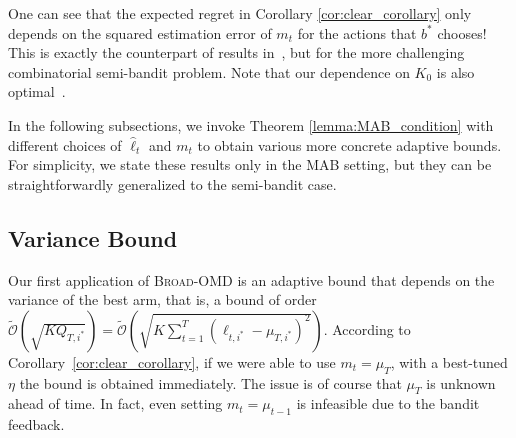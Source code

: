 \documentclass[final, 12pt]{colt2018} %
\newcommand{\inn}[1]{ \langle {#1} \rangle }
\begin{document}

One can see that the expected regret in Corollary \ref{cor:clear_corollary} only depends on the squared estimation error of $m_t$ for the actions that $b^*$ chooses! This is exactly the counterpart of results in~\citep{steinhardt2014adaptivity}, but for the more challenging combinatorial semi-bandit problem. 
Note that our dependence on $K_0$ is also optimal~\citep{audibert2013regret}.

In the following subsections, we invoke Theorem \ref{lemma:MAB_condition} with different choices of $\hat{\ell}_{t}$ and $m_t$ to obtain various more concrete adaptive bounds. %
For simplicity, we state these results only in the MAB setting, but they can be straightforwardly generalized to the semi-bandit case. 



\subsection{Variance Bound}
\label{subsubsection:variation bound}
Our first application of \textsc{Broad-OMD} is an adaptive bound that depends on the variance of the best arm, that is, a bound of order $\tilde{\mathcal{O}}\left(\sqrt{KQ_{T,i^*}}\right)=\tilde{\mathcal{O}}\left(\sqrt{K\sum_{t=1}^T(\ell_{t,i^*}-\mu_{T,i^*})^2}\right)$.  
According to Corollary~\ref{cor:clear_corollary}, if we were able to use $m_t = \mu_T$, with a best-tuned $\eta$ the bound is obtained immediately.
The issue is of course that $\mu_T$ is unknown ahead of time. 
In fact, even setting $m_t = \mu_{t-1}$ is infeasible due to the bandit feedback.
\end{document}
